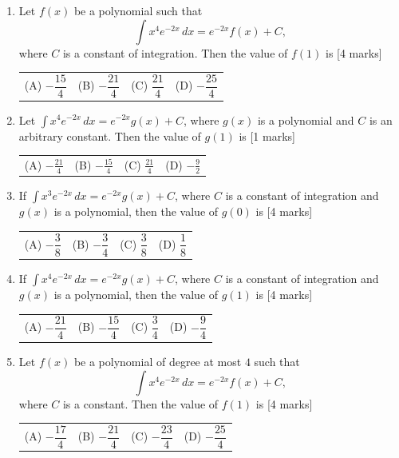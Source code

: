 \documentclass[11pt,a4paper]{article}
\begin{document}
\begin{enumerate}[resume]
{\begin{tabularx}{\linewidth}{X X X X}
\end{tabularx}}
\item Let \(f(x)\) be a polynomial such that
\[
\int x^4e^{-2x}\,dx=e^{-2x}f(x)+C,
\]
where \(C\) is a constant of integration. Then the value of \(f(1)\) is \hfill [4 marks]
{\renewcommand{\arraystretch}{1.8}
\begin{tabularx}{\linewidth}{X X X X}
(A) \quad \(-\dfrac{15}{4}\) & (B) \quad \(-\dfrac{21}{4}\) & (C) \quad \(\dfrac{21}{4}\) & (D) \quad \(-\dfrac{25}{4}\) \\[10pt]
\end{tabularx}}
\item Let \(\int x^{4}e^{-2x}\,dx=e^{-2x}g(x)+C\), where \(g(x)\) is a polynomial and \(C\) is an arbitrary constant. Then the value of \(g(1)\) is \hfill [1 marks]
{\renewcommand{\arraystretch}{1.8}
\begin{tabularx}{\linewidth}{X X X X}
(A) \quad \(-\frac{21}{4}\) & (B) \quad \(-\frac{15}{4}\) & (C) \quad \(\frac{21}{4}\) & (D) \quad \(-\frac{9}{2}\) \\[10pt]
\end{tabularx}}
\item If \(\displaystyle \int x^{3}e^{-2x}\,dx=e^{-2x}g(x)+C\), where \(C\) is a constant of integration and \(g(x)\) is a polynomial, then the value of \(g(0)\) is \hfill [4 marks]
{\renewcommand{\arraystretch}{1.8}
\begin{tabularx}{\linewidth}{X X X X}
(A) \quad \(-\dfrac{3}{8}\) & (B) \quad \(-\dfrac{3}{4}\) & (C) \quad \(\dfrac{3}{8}\) & (D) \quad \(\dfrac{1}{8}\) \\[10pt]
\end{tabularx}}
\item If \(\displaystyle \int x^{4}e^{-2x}\,dx=e^{-2x}g(x)+C\), where \(C\) is a constant of integration and \(g(x)\) is a polynomial, then the value of \(g(1)\) is \hfill [4 marks]
{\renewcommand{\arraystretch}{1.8}
\begin{tabularx}{\linewidth}{X X X X}
(A) \quad \(-\dfrac{21}{4}\) & (B) \quad \(-\dfrac{15}{4}\) & (C) \quad \(\dfrac{3}{4}\) & (D) \quad \(-\dfrac{9}{4}\) \\[10pt]
\end{tabularx}}
\item Let $f(x)$ be a polynomial of degree at most $4$ such that
\[
\int x^4 e^{-2x}\,dx=e^{-2x}f(x)+C,
\]
where $C$ is a constant. Then the value of $f(1)$ is \hfill [4 marks]
{\renewcommand{\arraystretch}{1.8}
\begin{tabularx}{\linewidth}{X X X X}
(A) \quad $-\dfrac{17}{4}$ & (B) \quad $-\dfrac{21}{4}$ & (C) \quad $-\dfrac{23}{4}$ & (D) \quad $-\dfrac{25}{4}$ \\[10pt]

\end{tabularx}}
\end{enumerate}
\end{document}
